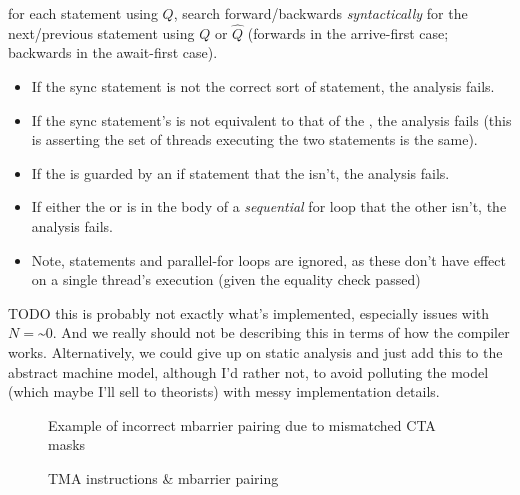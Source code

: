  for each  statement using $Q$, search forward/backwards \textit{syntactically} for the next/previous statement using $Q$ or $\widehat{Q}$ (forwards in the arrive-first case; backwards in the await-first case).
\filbreak
\begin{itemize}
  \item If the sync statement is not the correct sort of  statement, the analysis fails.
  \filbreak
  \item If the sync statement's  is not equivalent to that of the , the analysis fails (this is asserting the set of threads executing the two statements is the same).
  \filbreak
  \item If the  is guarded by an if statement that the  isn't, the analysis fails.
  \filbreak
  \item If either the  or  is in the body of a \textit{sequential} for loop that the other isn't, the analysis fails.
  \filbreak
  \item Note,  statements and parallel-for loops are ignored, as these don't have effect on a single thread's execution (given the  equality check passed)
\end{itemize}

TODO this is probably not exactly what's implemented, especially issues with $N = \text{\textasciitilde}0$.
And we really should not be describing this in terms of how the compiler works.
Alternatively, we could give up on static analysis and just add this to the abstract machine model, although I'd rather not, to avoid polluting the model (which maybe I'll sell to theorists) with messy implementation details.

\begin{figure*}[!b]

\caption{Example of incorrect mbarrier pairing due to mismatched CTA masks} \label{fig:multicast_pairing_fail}
\end{figure*}

\begin{figure*}[!b]

\caption{TMA instructions \& mbarrier pairing} \label{fig:tma_pairing_multicast}
\end{figure*}

\filbreak
{}

